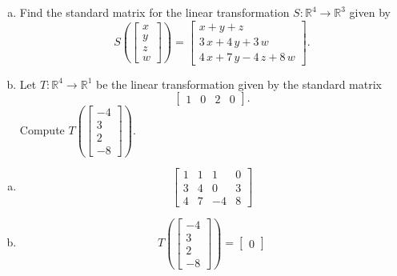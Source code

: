 
\begin{exerciseStatement}

\begin{enumerate}[(a)]
\item Find the standard matrix for the linear transformation \(S:\mathbb{R}^ 4  \to \mathbb{R}^ 3 \) given by \[S\left(  \left[\begin{array}{c}
x \\
y \\
z \\
{w}
\end{array}\right]  \right) =  \left[\begin{array}{c}
x + y + z \\
3 \, x + 4 \, y + 3 \, {w} \\
4 \, x + 7 \, y - 4 \, z + 8 \, {w}
\end{array}\right] .\]
\item Let \(T:\mathbb{R}^ 4  \to \mathbb{R}^ 1 \) be the linear transformation given by the standard matrix \[ \left[\begin{array}{cccc}
1 & 0 & 2 & 0
\end{array}\right] .\] Compute \(T\left( \left[\begin{array}{c}
-4 \\
3 \\
2 \\
-8
\end{array}\right]  \right)\). 
\end{enumerate}
    
\end{exerciseStatement}
    
\begin{exerciseAnswer} 

\begin{enumerate}[(a)]
\item \[ \left[\begin{array}{cccc}
1 & 1 & 1 & 0 \\
3 & 4 & 0 & 3 \\
4 & 7 & -4 & 8
\end{array}\right] \]
\item \[T\left( \left[\begin{array}{c}
-4 \\
3 \\
2 \\
-8
\end{array}\right]  \right)= \left[\begin{array}{c}
0
\end{array}\right] \]
\end{enumerate}
    
\end{exerciseAnswer}
    
